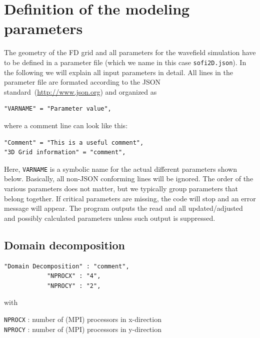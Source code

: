 \section{Definition of the modeling parameters}
\label{modelgeom}
The geometry of the FD grid and all parameters for the wavefield simulation have to be defined in a parameter file (which we name in this case \texttt{sofi2D.json}). In the following we will explain all input parameters in detail.
All lines in the parameter file are formated according to the JSON standard~(\url{http://www.json.org}) and organized as 
\begin{verbatim}
"VARNAME" = "Parameter value",
\end{verbatim}
where a comment line can look like this:
\begin{verbatim}
"Comment" = "This is a useful comment",
"3D Grid information" = "comment",
\end{verbatim}
Here, \texttt{VARNAME} is a symbolic name for the actual different parameters shown below. Basically, all non-JSON conforming lines will be ignored. The order of the various parameters does not matter, but we typically group parameters that belong together. If critical parameters are missing, the code will stop and an error message will appear. The program outputs the read and all updated/adjusted and possibly calculated parameters unless such output is suppressed.

\subsection{Domain decomposition}
\begin{verbatim}
"Domain Decomposition" : "comment",
            "NPROCX" : "4",
            "NPROCY" : "2",
\end{verbatim}

with

\texttt{NPROCX} : number of (MPI) processors in x-direction\\
\texttt{NPROCY} : number of (MPI) processors in y-direction

